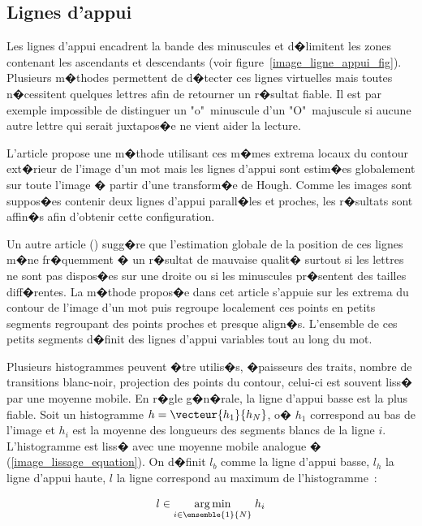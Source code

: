 \subsection{Lignes d'appui}
\label{image_ligne_appui}

Les lignes d'appui encadrent la bande des minuscules et d�limitent les zones contenant les ascendants et descendants (voir figure~\ref{image_ligne_appui_fig}). Plusieurs m�thodes permettent de d�tecter ces lignes virtuelles mais toutes n�cessitent quelques lettres afin de retourner un r�sultat fiable. Il est par exemple impossible de distinguer un "o"~minuscule d'un "O"~majuscule si aucune autre lettre qui serait juxtapos�e ne vient aider la lecture. 

L'article  propose une m�thode utilisant ces m�mes extrema locaux du contour ext�rieur de l'image d'un mot mais les lignes d'appui sont estim�es globalement sur toute l'image � partir d'une transform�e de Hough. Comme les images sont suppos�es contenir deux lignes d'appui parall�les et proches, les r�sultats sont affin�s afin d'obtenir cette configuration.

Un autre article () sugg�re que l'estimation globale de la position de ces lignes m�ne fr�quemment � un r�sultat de mauvaise qualit� surtout si les lettres ne sont pas dispos�es sur une droite ou si les minuscules pr�sentent des tailles diff�rentes. La m�thode propos�e dans cet article s'appuie sur les extrema du contour de l'image d'un mot puis regroupe localement ces points en petits segments regroupant des points proches et presque align�s. L'ensemble de ces petits segments d�finit des lignes d'appui variables tout au long du mot.

Plusieurs histogrammes peuvent �tre utilis�s, �paisseurs des traits, nombre de transitions blanc-noir, projection des points du contour, celui-ci est souvent liss� par une moyenne mobile. En r�gle g�n�rale, la ligne d'appui basse est la plus fiable. Soit un histogramme $h=\vecteur{h_1}{h_N}$, o� $h_1$ correspond au bas de l'image et $h_i$ est la moyenne des longueurs des segments blancs de la ligne $i$. L'histogramme est liss� avec une moyenne mobile analogue � (\ref{image_lissage_equation}). On d�finit $l_b$ comme la ligne d'appui basse, $l_h$ la ligne d'appui haute, $l$ la ligne correspond au maximum de l'histogramme~:

            \begin{eqnarray}
            l \in \underset{i \in \ensemble{1}{N}} { \arg \min } \; h_i
            \end{eqnarray}

